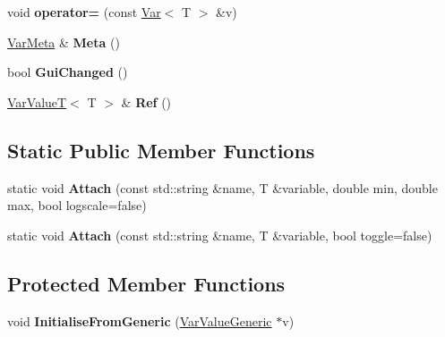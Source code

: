\begin{DoxyCompactItemize}
\item 
void {\bfseries operator=} (const \hyperlink{classpangolin_1_1_var}{Var}$<$ T $>$ \&v)\hypertarget{classpangolin_1_1_var_a653604048343123abb364356348dfb9e}{}\label{classpangolin_1_1_var_a653604048343123abb364356348dfb9e}

\item 
\hyperlink{structpangolin_1_1_var_meta}{Var\+Meta} \& {\bfseries Meta} ()\hypertarget{classpangolin_1_1_var_a200ac286e880eb3ef6d815b742448c6e}{}\label{classpangolin_1_1_var_a200ac286e880eb3ef6d815b742448c6e}

\item 
bool {\bfseries Gui\+Changed} ()\hypertarget{classpangolin_1_1_var_ae8cf8e2f9df55e36d7a14b5033157d6d}{}\label{classpangolin_1_1_var_ae8cf8e2f9df55e36d7a14b5033157d6d}

\item 
\hyperlink{classpangolin_1_1_var_value_t}{Var\+ValueT}$<$ T $>$ \& {\bfseries Ref} ()\hypertarget{classpangolin_1_1_var_a3989d6eb6a1d2fb373e0510a97bbb339}{}\label{classpangolin_1_1_var_a3989d6eb6a1d2fb373e0510a97bbb339}

\end{DoxyCompactItemize}
\subsection*{Static Public Member Functions}
\begin{DoxyCompactItemize}
\item 
static void {\bfseries Attach} (const std\+::string \&name, T \&variable, double min, double max, bool logscale=false)\hypertarget{classpangolin_1_1_var_a1568007fddbc4d22009d303419769f51}{}\label{classpangolin_1_1_var_a1568007fddbc4d22009d303419769f51}

\item 
static void {\bfseries Attach} (const std\+::string \&name, T \&variable, bool toggle=false)\hypertarget{classpangolin_1_1_var_a5311bec43d936d9e6d967a6bf7264446}{}\label{classpangolin_1_1_var_a5311bec43d936d9e6d967a6bf7264446}

\end{DoxyCompactItemize}
\subsection*{Protected Member Functions}
\begin{DoxyCompactItemize}
\item 
void {\bfseries Initialise\+From\+Generic} (\hyperlink{classpangolin_1_1_var_value_generic}{Var\+Value\+Generic} $\ast$v)\hypertarget{classpangolin_1_1_var_af003420edf68489edea89e958e4bb7eb}{}\label{classpangolin_1_1_var_af003420edf68489edea89e958e4bb7eb}

\end{DoxyCompactItemize}
